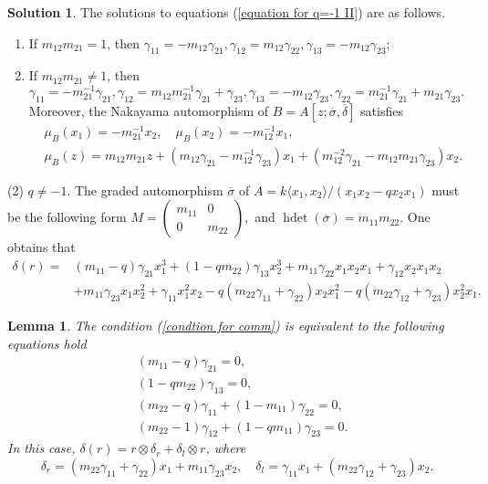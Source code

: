 \documentclass[a4paper,10pt]{amsart}
\newtheorem{lemma}[theorem]{Lemma}
\theoremstyle{definition}
\newtheorem{solution}[theorem]{Solution}
\numberwithin{equation}{section}
\DeclareMathOperator{\hdet}{hdet}
\begin{document}
\begin{solution}\label{solution: q=-1 II}
The solutions to equations (\ref{equation for q=-1 II}) are as follows.
\begin{enumerate}
\item If $m_{12}m_{21}=1$, then
$
\gamma_{11}=-m_{12}\gamma_{21},\gamma_{12}=m_{12}\gamma_{22},
\gamma_{13}=-m_{12}\gamma_{23};
$
\item If $m_{12}m_{21}\neq1$, then $
\gamma_{11}=-m_{21}^{-1}\gamma_{21},\gamma_{12}=m_{12}m_{21}^{-1}\gamma_{21}+\gamma_{23},
\gamma_{13}=-m_{12}\gamma_{23},\gamma_{22}=m_{21}^{-1}\gamma_{21}+m_{21}\gamma_{23}.
$
Moreover, the Nakayama automorphism of $B=A[z;\overline{\sigma},\overline{\delta}]$ satisfies
\begin{align*}
&\mu_B(x_1)=-m_{21}^{-1}x_2,\quad \mu_B(x_2)=-m_{12}^{-1}x_1,\\ &\mu_B(z)=m_{12}m_{21}z+(m_{12}\gamma_{21}-m_{12}^{-1}\gamma_{23})x_1+(m_{12}^{-2}\gamma_{21}-m_{12}m_{21}\gamma_{23})x_2.
\end{align*}
\end{enumerate}
\end{solution}
\noindent (2) $q\neq-1$. The graded automorphism $\overline{\sigma}$ of $A=k\langle x_1,x_2\rangle/(x_1x_2-qx_2x_1)$ must be the following form
$
M=
\left(
\begin{array}{cc}
m_{11}  & 0\\
0   &m_{22}
\end{array}
\right),
$ and $\hdet(\overline{\sigma})=m_{11}m_{22}$.
One obtains that
\begin{align*}
\delta(r)=&(m_{11}-q)\gamma_{21}x_1^3+(1-qm_{22})\gamma_{13}x_2^3+m_{11}\gamma_{22}x_1x_2x_1+\gamma_{12}x_2x_1x_2\\
&+m_{11}\gamma_{23}x_1x_2^2+\gamma_{11}x_1^2x_2-q(m_{22}\gamma_{11}+\gamma_{22})x_2x_1^2-q(m_{22}\gamma_{12}+\gamma_{23})x_2^2x_1.
\end{align*}
\begin{lemma}
The condition (\ref{condtion for comm}) is equivalent to the following equations hold
\begin{equation}\label{equation for qneq-1}
\begin{aligned}
&(m_{11}-q)\gamma_{21}=0,\\
&(1-qm_{22})\gamma_{13}=0,\\
&(m_{22}-q)\gamma_{11}+(1-m_{11})\gamma_{22}=0,\\
&(m_{22}-1)\gamma_{12}+(1-qm_{11})\gamma_{23}=0.
\end{aligned}
\end{equation}
In this case, $\delta(r)=r\otimes \delta_r+\delta_l\otimes r$, where
\begin{equation*}
\delta_{r}=(m_{22}\gamma_{11}+\gamma_{22})x_1+m_{11}\gamma_{23}x_2,\quad
\delta_{l}=\gamma_{11}x_1+(m_{22}\gamma_{12}+\gamma_{23})x_2.
\end{equation*}
\end{lemma}
\end{document}
